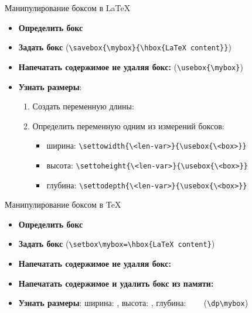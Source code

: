 \begin{frame}[fragile]{Манипулирование боксом в \LaTeX\lW\magicPage}\relax
    \begin{itemize}
        \item \textbf{Определить бокс} 
        \item \textbf{Задать бокс} \ccol{\savebox} (\lstinline|\savebox{\mybox}{\hbox{LaTeX content}}|)
        \item \textbf{Напечатать содержимое не удаляя бокс:} \ccol{\usebox} (\lstinline|\usebox{\mybox}|)
        \item \textbf{Узнать размеры}: 
        \begin{enumerate}
            \item Создать переменную длины: \ccol\newlength
            \item Определить переменную одним из измерений боксов:
            \begin{itemize}
                \item ширина: \verb|\settowidth{\<len-var>}{\usebox{\<box>}}|
                \item высота: \verb|\settoheight{\<len-var>}{\usebox{\<box>}}|
                \item глубина: \verb|\settodepth{\<len-var>}{\usebox{\<box>}}|
            \end{itemize}
        \end{enumerate}
    \end{itemize}

\end{frame}


\begin{frame}[fragile]{Манипулирование боксом в \TeX\tW\magicPage}\relax
    \begin{itemize}
        \item \textbf{Определить бокс} 
        \item \textbf{Задать бокс}  (\lstinline|\setbox\mybox=\hbox{LaTeX content}|)
        \item \textbf{Напечатать содержимое не удаляя бокс:} 
        \item \textbf{Напечатать содержимое и удалить бокс из памяти:} 
        \item \textbf{Узнать размеры}: ширина: \ccol\wd, высота: \ccol\ht, глубина: \ccol\dp\ ~~ (\lstinline|\dp\mybox|)
         
    \end{itemize}

\end{frame}

